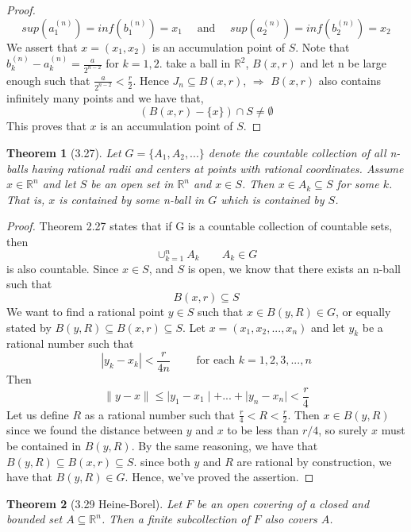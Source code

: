 \documentclass[aps,pra,notitlepage,amsmath,amssymb,letterpaper,12pt]{revtex4-1}
\newtheorem{theorem}{Theorem}
\begin{document}
\begin{proof}
$$sup(a_{1}^{(n)}) = inf(b_{1}^{(n)}) = x_{1} \quad \textrm{ and } \quad sup(a_{2}^{(n)}) = inf(b_{2}^{(n)}) = x_{2}$$
We assert that $x=(x_{1}, x_{2})$ is an accumulation point of $S$. Note that $b_{k}^{(n)}-a_{k}^{(n)} = \frac{a}{2^{n-2}}$ for $k = 1,2$. take a ball in $\mathbb{R}^{2}$, $B(x,r)$ and let n be large enough such that $\frac{a}{2^{n-2}} < \frac{r}{2}$. Hence $J_{n} \subseteq B(x,r)$, $\Rightarrow$ $B(x,r)$ also contains infinitely many points and we have that,
$$ (B(x,r)- \{x\}) \cap S \ne \emptyset $$
This proves that $x$ is an accumulation point of $S$.



\end{proof}


\begin{theorem}[3.27] \nonumber
Let $G = \{A_{1},A_{2},...\}$ denote the countable collection of all n-balls having rational radii and centers at points with rational coordinates. Assume $x \in \mathbb{R}^n$ and let $S$ be an open set in $\mathbb{R}^n$ and $x \in S$. Then $x \in A_{k} \subseteq S$ for some $k$. That is, $x$ is contained by some n-ball in $G$ which is contained by $S$.
\end{theorem}
\begin{proof}
Theorem 2.27 states that if G is a countable collection of countable sets, then
\[\cup_{k=1}^{n} A_{k} \qquad A_{k} \in G\]
is also countable. Since $x \in S$, and $S$ is open, we know that there exists an n-ball such that
\[B(x,r) \subseteq S\]
We want to find a rational point $y\in S$ such that $x \in B(y,R) \in G$, or equally stated by $B(y,R) \subseteq B(x,r) \subseteq S$. Let
$x=(x_{1},x_{2},...,x_{n})$ and let $y_{k}$ be a rational number such that
\[\left| y_{k} - x_{k} \right| < \frac{r}{4n} \qquad \textrm{ for each } k=1,2,3,...,n\]
Then
\[\|y-x\| \leq \mid y_{1}-x_{1} \mid + ... + \mid y_{n}-x_{n} \mid < \frac{r}{4}\]
Let us define $R$ as a rational number such that $\frac{r}{4} < R < \frac{r}{2}$. Then
$x \in B(y,R)$ since we found the distance between $y$ and $x$ to be less than $r/4$, so surely $x$ must be contained in $B(y,R)$. By the same reasoning, we have that $B(y,R) \subseteq B(x,r) \subseteq S$. since both $y$ and $R$ are rational by construction, we have that $B(y,R) \in G$. Hence, we've proved the assertion.
\end{proof}


\begin{theorem}[3.29 Heine-Borel]
Let $F$ be an open covering of a closed and bounded set $A \subseteq \mathbb{R}^n$. Then a finite subcollection of $F$ also covers $A$.
\end{theorem}
\end{document}
